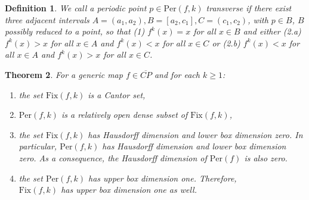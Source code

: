 \documentclass[12pt, a4paper]{amsart}
\newtheorem{theorem}{Theorem}[section]
\newtheorem{definition}[theorem]{Definition}
\def\per{\mathrm{Per}}
\newcommand{\?}{{\bf ???}}
\def\CP{\overline{CP}}
\newcommand{\fix}{\mathrm{Fix}}
\begin{document}
\begin{definition}\label{transverse} 
We call a periodic point $p \in \per(f,k) $ \emph{transverse} if  there exist three adjacent intervals
$A = (a_1,a_2), B = [a_2,c_1], C = (c_1,c_2)$, with $p \in B$, $B$ possibly reduced to a point,
so that (1)  $f^k(x) = x$ for all $x \in B$ and either (2.a) $f^k(x) > x$ for all $x \in A$ and $f^k(x) < x$ for all $x \in C$ or (2.b)  $f^k(x) <x$ for all $x \in A$ and $f^k(x) > x$ for all $x \in C$.
\end{definition}


\begin{theorem}\label{thm:periodicpoints}
	For a generic map $f \in \CP$ and  for each $k \geq 1$:
	\begin{enumerate}
		\item \label{pp1} the set $\fix(f,k)$ is a Cantor set, 
		\item  \label{pp2} $\per(f,k)$ is a relatively open dense subset of $\fix(f,k)$, 
		\item \label{pp3}  the set $\fix(f,k)$ has Hausdorff dimension and  lower box dimension zero. In particular, $\per(f,k)$ has Hausdorff dimension and lower box dimension zero. As a consequence, the Hausdorff dimension of $\per(f)$ is also zero.
		 \item \label{pp4} the set $\per(f,k)$ has upper box dimension one. Therefore, \\
  $\fix(f,k)$ has upper box dimension one as well.
	\end{enumerate}
\end{theorem}
\end{document}
